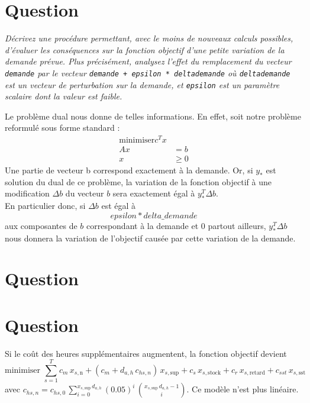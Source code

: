 \documentclass[12pt,oneside,a4paper]{article}
\newcommand{\question}
{
\addtocounter{section}{1}
\section*{Question \thesection}
}
\newcommand{\myX}[2]{x_{#1,\text{#2}}}
\newcommand{\xSemaine}[1]{\myX{s}{#1}}
\newcommand{\xn}{\xSemaine{n}}
\newcommand{\xsup}{\xSemaine{sup}}
\newcommand{\xstock}{\xSemaine{stock}}
\newcommand{\xretard}{\xSemaine{retard}}
\newcommand{\xsst}{\xSemaine{sst}}
\begin{document}
\question %
\emph{Décrivez une procédure permettant, avec le moins de nouveaux calculs
possibles, d'évaluer les conséquences sur la fonction objectif d’une petite
variation de la demande prévue. Plus précisément, analysez l'effet du
remplacement du vecteur \texttt{demande} 
par le vecteur \texttt{demande + epsilon * delta\textunderscore demande} 
où \texttt{delta\textunderscore demande} est un vecteur de perturbation 
sur la demande, 
et \texttt{epsilon} est un paramètre scalaire dont la valeur est faible.}

Le problème dual nous donne de telles informations. En effet, soit notre problème reformulé sous forme standard : \\
\begin{align*} 
	\text{minimiser} c^Tx &\\
	Ax &= b  \\
	x &\geq 0 
\end{align*}
Une partie de vecteur b correspond exactement à la demande.
Or, si $y_{*}$ est solution du dual de ce problème, la variation de la fonction objectif à une modification $\Delta b$ du vecteur $b$ sera exactement égal à $y_{*}^{T}\Delta b$. \\
En particulier donc, si $\Delta b$ est égal à $$epsilon * delta\_demande$$ aux composantes de $b$ correspondant à la demande et 0 partout ailleurs, $y_{*}^{T}\Delta b$ nous donnera la variation de l'objectif causée par cette variation de la demande.

\question %

\question %
Si le coût des heures supplémentaires augmentent, la fonction objectif devient 
\[
  \mbox{minimiser } 
  \sum_{s=1}^{T} 
  c_m\, \xn + (c_m + d_{a,h} \, c_{hs, n})\, \xsup
  + c_s\, \xstock + c_r\, \xretard + c_{sst}\, \xsst
\]
avec $c_{hs, n} = c_{hs, 0} \, \sum_{i=0}^{\xsup \, d_{a, h}} (0.05)^{i} \, {\xsup \, d_{a,h} -1 \choose i}$. Ce modèle n'est plus linéaire.
\end{document}
